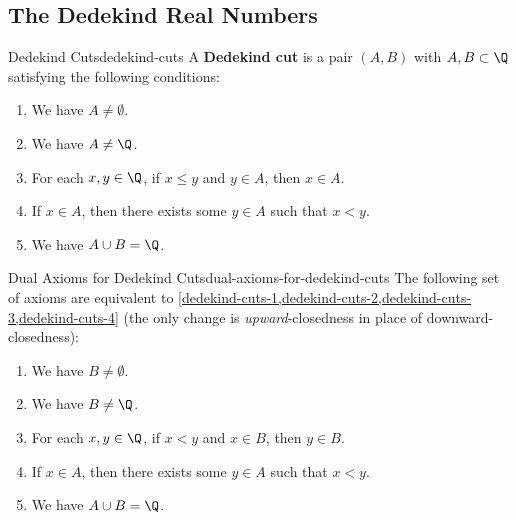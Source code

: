 \subsection{The Dedekind Real Numbers}\label{subsection-the-dedekind-real-numbers}
\begin{definition}{Dedekind Cuts}{dedekind-cuts}%
    A \textbf{Dedekind cut} is a pair $(A,B)$ with $A,B\subset\Q$ satisfying the following conditions:
    \begin{enumerate}
        \item\label{dedekind-cuts-1}We have $A\neq\emptyset$.
        \item\label{dedekind-cuts-2}We have $A\neq\Q$.
        \item\label{dedekind-cuts-3}For each $x,y\in\Q$, if $x\leq y$ and $y\in A$, then $x\in A$.
        \item\label{dedekind-cuts-4}If $x\in A$, then there exists some $y\in A$ such that $x\less y$.
        \item\label{dedekind-cuts-5}We have $A\cup B=\Q$.
    \end{enumerate}
\end{definition}
\begin{remark}{Dual Axioms for Dedekind Cuts}{dual-axioms-for-dedekind-cuts}%
    The following set of axioms are equivalent to \cref{dedekind-cuts-1,dedekind-cuts-2,dedekind-cuts-3,dedekind-cuts-4} (the only change is \textit{upward}-closedness in place of downward-closedness):
    \begin{enumerate}
        \item\label{dual-axioms-for-dedekind-cuts-1}We have $B\neq\emptyset$.
        \item\label{dual-axioms-for-dedekind-cuts-2}We have $B\neq\Q$.
        \item\label{dual-axioms-for-dedekind-cuts-3}For each $x,y\in\Q$, if $x\less y$ and $x\in B$, then $y\in B$.
        \item\label{dual-axioms-for-dedekind-cuts-4}If $x\in A$, then there exists some $y\in A$ such that $x\less y$.
        \item\label{dual-axioms-for-dedekind-cuts-5}We have $A\cup B=\Q$.
    \end{enumerate}
\end{remark}
